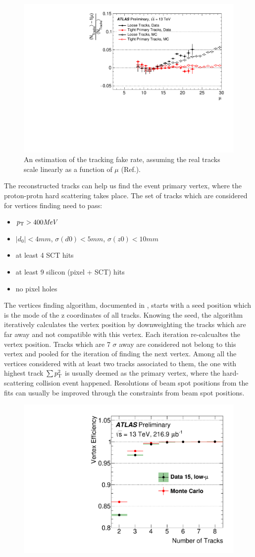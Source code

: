 \begin{figure}[htpb!]
\begin{center}
  \includegraphics[width=0.55\linewidth]{figures/Reco/TrackingFake}
\caption{An estimation of the tracking fake rate, assuming the real tracks scale linearly as a function of $\mu$ (Ref.\cite{ATL-PHYS-PUB-2015-051}). }
\label{fig:reco-trackingfake}
\end{center}
\end{figure}


The reconstructed tracks can help us find the event primary vertex, where the proton-protn hard scattering takes place. The set of tracks which are considered for vertices finding need to pass:

\begin{itemize}
\item $p_{{\rm T}} > 400 \textit{MeV}$
\item $|d_0|<4mm$, $\sigma(d0) < 5 mm$, $\sigma(z0) < 10 mm$
\item at least 4 SCT hits
\item at least 9 silicon (pixel + SCT) hits
\item no pixel holes
\end{itemize}

The vertices finding algorithm, documented in \cite{PERF-2015-01}, starts with a seed position which is the mode of the z coordinates of all tracks. Knowing the seed, the algorithm iteratively calculates the vertex position by downweighting the tracks which are far away and not compatible with this vertex. Each iteration re-calcualtes the vertex position. Tracks which are 7 $\sigma$ away are considered not belong to this vertex and pooled for the iteration of finding the next vertex. Among all the vertices considered with at least two tracks associated to them, the one with highest track $\sum p_{{\rm T}}^2$ is usually deemed as the primary vertex, where the hard-scattering collision event happened. Resolutions of beam spot positions from the fits can usually be improved through the constraints from beam spot positions.

\begin{figure}[htpb!]
\begin{center}
  \includegraphics[width=0.55\linewidth]{figures/Reco/TrackingVertex}
\caption{\cite{ATL-PHYS-PUB-2015-026}}
\label{fig:reco-primaryvertexeff}
\end{center}
\end{figure}


